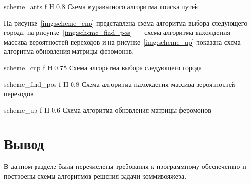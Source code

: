 	{scheme_ants}
	{f}
	{H}
	{0.8\textwidth}
	{Схема муравьиного алгоритма поиска путей}
	
На рисунке~\ref{img:scheme_cnp} представлена схема алгоритма выбора следующего города, на рисунке~\ref{img:scheme_find_pos}~--- схема алгоритма нахождения массива вероятностей переходов и на рисунке~\ref{img:scheme_up} показана схема алгоритма обновления матрицы феромонов.

	{scheme_cnp}
	{f}
	{H}
	{0.75\textwidth}
	{Схема алгоритма выбора следующего города}

	{scheme_find_pos}
	{f}
	{H}
	{0.8\textwidth}
	{Схема алгоритма нахождения массива вероятностей переходов}

	{scheme_up}
	{f}
	{H}
	{0.6\textwidth}
	{Схема алгоритма обновления матрицы феромонов}

\section*{Вывод}

В данном разделе были перечислены требования к программному обеспечению и построены схемы алгоритмов решения задачи коммивояжера.